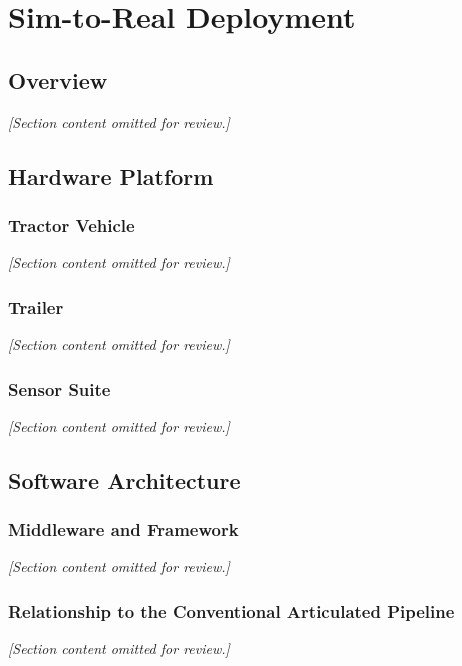 \chapter{Sim-to-Real Deployment}
\label{ch:sim_to_real}

\section{Overview}
\textit{[Section content omitted for review.]}

\section{Hardware Platform}

\subsection{Tractor Vehicle}
\textit{[Section content omitted for review.]}

\subsection{Trailer}
\textit{[Section content omitted for review.]}

\subsection{Sensor Suite}
\textit{[Section content omitted for review.]}

\section{Software Architecture}

\subsection{Middleware and Framework}
\textit{[Section content omitted for review.]}

\subsection{Relationship to the Conventional Articulated Pipeline}
\textit{[Section content omitted for review.]}

